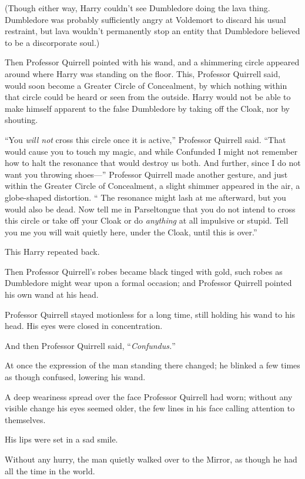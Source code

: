 (Though either way, Harry couldn’t see Dumbledore doing the lava thing.
Dumbledore was probably sufficiently angry at Voldemort to discard his usual
restraint, but lava wouldn’t permanently stop an entity that Dumbledore
believed to be a discorporate soul.)

Then Professor Quirrell pointed with his wand, and a shimmering circle appeared
around where Harry was standing on the floor. This, Professor Quirrell said,
would soon become a Greater Circle of Concealment, by which nothing within that
circle could be heard or seen from the outside. Harry would not be able to make
himself apparent to the false Dumbledore by taking off the Cloak, nor by
shouting.

“You \emph{will not} cross this circle once it is active,” Professor Quirrell
said. “That would cause you to touch my magic, and while Confunded I might not
remember how to halt the resonance that would destroy us both. And further,
since I do not want you throwing shoes—” Professor Quirrell made another
gesture, and just within the Greater Circle of Concealment, a slight shimmer
appeared in the air, a globe-shaped distortion. “ The resonance might lash
at me afterward, but you would also be dead. Now tell me in Parseltongue that
you do not intend to cross this circle or take off your Cloak or do
\emph{anything} at all impulsive or stupid. Tell you me you will wait quietly
here, under the Cloak, until this is over.”

This Harry repeated back.

Then Professor Quirrell’s robes became black tinged with gold, such robes as
Dumbledore might wear upon a formal occasion; and Professor Quirrell pointed
his own wand at his head.

Professor Quirrell stayed motionless for a long time, still holding his wand to
his head. His eyes were closed in concentration.

And then Professor Quirrell said, “\emph{Confundus.}”

At once the expression of the man standing there changed; he blinked a few
times as though confused, lowering his wand.

A deep weariness spread over the face Professor Quirrell had worn; without any
visible change his eyes seemed older, the few lines in his face calling
attention to themselves.

His lips were set in a sad smile.

Without any hurry, the man quietly walked over to the Mirror, as though he had
all the time in the world.

